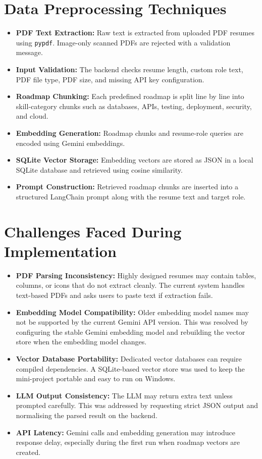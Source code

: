 \documentclass[12pt,a4paper]{report}
\begin{document}
\section{Data Preprocessing Techniques}

\begin{itemize}
  \item \textbf{PDF Text Extraction:} Raw text is extracted from uploaded PDF
        resumes using \texttt{pypdf}. Image-only scanned PDFs are rejected with
        a validation message.
  \item \textbf{Input Validation:} The backend checks resume length, custom role
        text, PDF file type, PDF size, and missing API key configuration.
  \item \textbf{Roadmap Chunking:} Each predefined roadmap is split line by line
        into skill-category chunks such as databases, APIs, testing, deployment,
        security, and cloud.
  \item \textbf{Embedding Generation:} Roadmap chunks and resume-role queries are
        encoded using Gemini embeddings.
  \item \textbf{SQLite Vector Storage:} Embedding vectors are stored as JSON in a
        local SQLite database and retrieved using cosine similarity.
  \item \textbf{Prompt Construction:} Retrieved roadmap chunks are inserted into
        a structured LangChain prompt along with the resume text and target role.
\end{itemize}

\section{Challenges Faced During Implementation}

\begin{itemize}
  \item \textbf{PDF Parsing Inconsistency:} Highly designed resumes may contain
        tables, columns, or icons that do not extract cleanly. The current system
        handles text-based PDFs and asks users to paste text if extraction fails.
  \item \textbf{Embedding Model Compatibility:} Older embedding model names may
        not be supported by the current Gemini API version. This was resolved by
        configuring the stable Gemini embedding model and rebuilding the vector
        store when the embedding model changes.
  \item \textbf{Vector Database Portability:} Dedicated vector databases can
        require compiled dependencies. A SQLite-based vector store was used to
        keep the mini-project portable and easy to run on Windows.
  \item \textbf{LLM Output Consistency:} The LLM may return extra text unless
        prompted carefully. This was addressed by requesting strict JSON output
        and normalising the parsed result on the backend.
  \item \textbf{API Latency:} Gemini calls and embedding generation may introduce
        response delay, especially during the first run when roadmap vectors are
        created.
\end{itemize}
\end{document}
